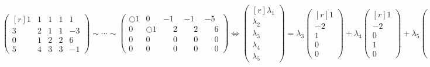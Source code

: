 \documentclass[a4paper,table]{report}
\begin{document}
\[
  \begin{pmatrix*}[r]
    1 & 1 & 1 & 1 & 1  \\
    3 & 2 & 1 & 1 & -3 \\
    0 & 1 & 2 & 2 & 6 \\
    5 & 4 & 3 & 3 & -1
  \end{pmatrix*} \sim \cdots \sim
  \begin{pmatrix*}
    \Circle{1} & 0 & -1 & -1 & -5 \\
    0 & \Circle{1} & \phantom{-}2 & \phantom{-}2 & \phantom{-}6 \\
    0 & 0 & \phantom{-}0 & \phantom{-}0 & \phantom{-}0 \\
    0 & 0 & \phantom{-}0 & \phantom{-}0 & \phantom{-}0 
  \end{pmatrix*} \Leftrightarrow 
  \begin{pmatrix*}[r] \lambda _{1} \\ \lambda _{2} \\ \lambda _{3} \\ \lambda _{4} \\
  \lambda _{5}  \end{pmatrix*} = \lambda _{3} 
  \begin{pmatrix*}[r] 1 \\ -2 \\ 1 \\ 0 \\ 0  \end{pmatrix*} + \lambda _{4} 
  \begin{pmatrix*}[r] 1 \\ -2 \\ 0 \\ 1 \\ 0  \end{pmatrix*} + \lambda _{5} 
  \begin{pmatrix*}[r] 5 \\ -6 \\ 0 \\ 0 \\ 1  \end{pmatrix*}
\] 
\end{document}
